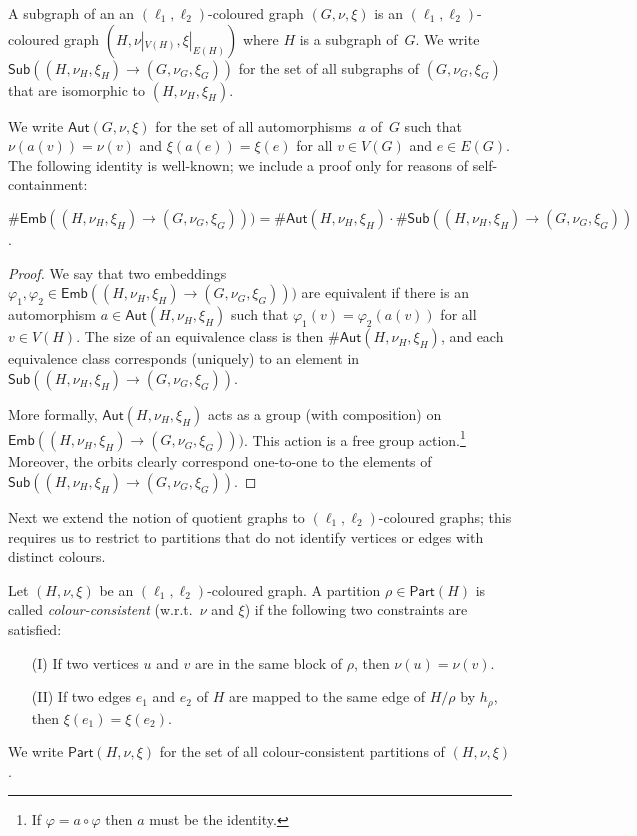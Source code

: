 \documentclass[authorcolumns,numberwithinsect]{no-lipics-v2022}
\newcommand{\embs}[2]{\mathsf{Emb}(#1 \to #2)}
\newcommand{\auts}{\mathsf{Aut}}
\newcommand{\subs}[2]{\mathsf{Sub}(#1 \to #2)}
\newcommand{\ppart}{\ensuremath{\mathsf{Part}}}
\begin{document}
A subgraph of an an $(\ell_1,\ell_2)$-coloured graph $(G,\nu,\xi)$ is an $(\ell_1,\ell_2)$-coloured graph $(H,\nu|_{V(H)},\xi|_{E(H)})$ where $H$ is a subgraph of~$G$. 
We write $\subs{(H,\nu_H,\xi_H)}{(G,\nu_G,\xi_G)}$ for the set of all subgraphs of $(G,\nu_G,\xi_G)$ that are isomorphic to $(H,\nu_H,\xi_H)$.

We write $\auts(G,\nu,\xi)$ for the set of all automorphisms~$a$ of~$G$ such that $\nu(a(v))=\nu(v)$ and $\xi(a(e))=\xi(e)$ for all $v \in V(G)$ and $e\in E(G)$. The following identity is well-known; we include a proof only for reasons of self-containment:

\begin{proposition}\label{prop:col_subs_to_embs}
    $\#\embs{(H,\nu_H,\xi_H)}{(G,\nu_G,\xi_G))} = \#\auts(H,\nu_H,\xi_H)\cdot \#\subs{(H,\nu_H,\xi_H)}{(G,\nu_G,\xi_G)}$.
\end{proposition}
\begin{proof}
    We say that two embeddings $\varphi_1,\varphi_2\in\embs{(H,\nu_H,\xi_H)}{(G,\nu_G,\xi_G))}$ are equivalent if there is an automorphism $a\in \auts(H,\nu_H,\xi_H)$ such that $\varphi_1(v)=\varphi_2(a(v))$ for all $v\in V(H)$. The size of an equivalence class is then $\#\auts(H,\nu_H,\xi_H)$, and each equivalence class corresponds (uniquely) to an element in $\subs{(H,\nu_H,\xi_H)}{(G,\nu_G,\xi_G)}$.

    More formally, $\auts(H,\nu_H,\xi_H)$ acts as a group (with composition) on $\embs{(H,\nu_H,\xi_H)}{(G,\nu_G,\xi_G))}$. This action is a free group action.\footnote{If $\varphi = a \circ \varphi$ then $a$ must be the identity.} Moreover, the orbits clearly correspond one-to-one to the elements of $\subs{(H,\nu_H,\xi_H)}{(G,\nu_G,\xi_G)}$.
\end{proof}

Next we extend the notion of quotient graphs to $(\ell_1,\ell_2)$-coloured graphs; this requires us to restrict to partitions that do not identify vertices or edges with distinct colours.

\begin{definition}
    Let $(H,\nu,\xi)$ be an $(\ell_1,\ell_2)$-coloured graph. A partition $\rho \in \ppart(H)$ is called \emph{colour-consistent} (w.r.t.\ $\nu$ and $\xi$) if the following two constraints are satisfied:
    \begin{itemize}
        \item[(I)] If two vertices $u$ and $v$ are in the same block of $\rho$, then $\nu(u)=\nu(v)$.
        \item[(II)] If two edges $e_1$ and $e_2$ of $H$ are mapped to the same edge of $H/\rho$ by $h_\rho$, then $\xi(e_1)=\xi(e_2)$. 
    \end{itemize}
    We write $\ppart(H,\nu,\xi)$ for the set of all colour-consistent partitions of $(H,\nu,\xi)$.
\end{definition}
\end{document}
